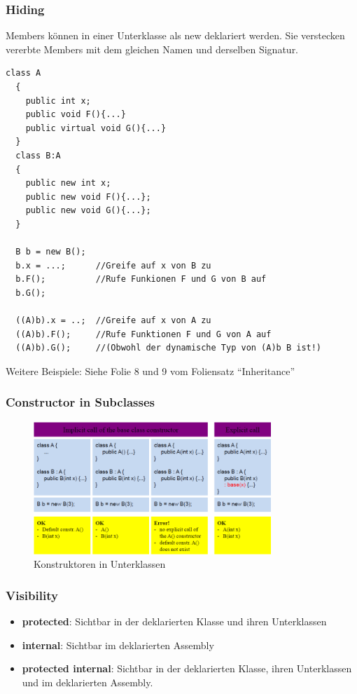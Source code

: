 \subsubsection{Hiding}
Members können in einer Unterklasse als new deklariert werden. Sie verstecken
vererbte Members mit dem gleichen Namen und derselben Signatur. 
\begin{lstlisting}[style=Csharp]
  class A
  {
    public int x; 
    public void F(){...}
    public virtual void G(){...}
  }
  class B:A
  {
    public new int x; 
    public new void F(){...};
    public new void G(){...};
  }
  
  B b = new B(); 
  b.x = ...;      //Greife auf x von B zu 
  b.F();          //Rufe Funkionen F und G von B auf
  b.G(); 
  
  ((A)b).x = ..;  //Greife auf x von A zu
  ((A)b).F();     //Rufe Funktionen F und G von A auf
  ((A)b).G();     //(Obwohl der dynamische Typ von (A)b B ist!)
\end{lstlisting}
Weitere Beispiele: Siehe Folie 8 und 9 vom Foliensatz "`Inheritance"'

\subsubsection{Constructor in Subclasses}
\begin{figure}[h]
  \centering
  \includegraphics[height=5cm, ]{images/CSharp/ConstructorsInSubclasses}
  \caption{Konstruktoren in Unterklassen} 
\end{figure}

\subsubsection{Visibility}
\begin{itemize}
  \item \textbf{protected}: Sichtbar in der deklarierten Klasse und ihren
  Unterklassen
  \item \textbf{internal}: Sichtbar im deklarierten Assembly
  \item \textbf{protected internal}: Sichtbar in der deklarierten Klasse, ihren
  Unterklassen und im deklarierten Assembly. 
\end{itemize}

